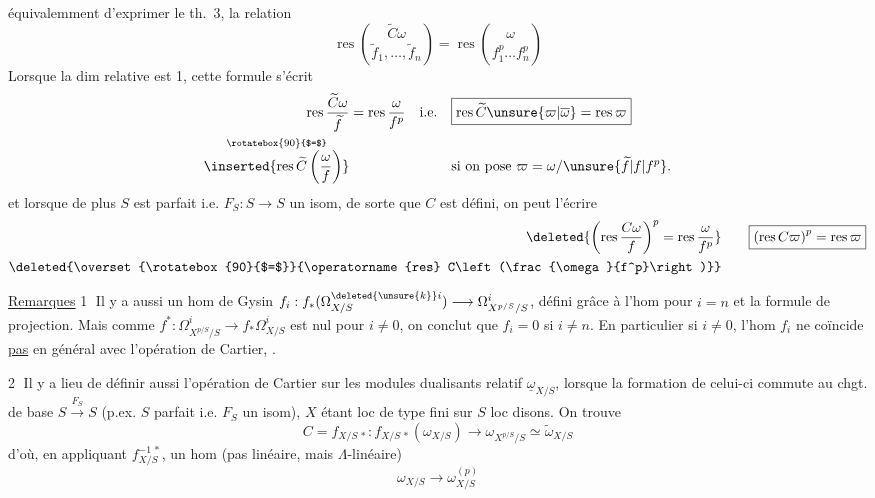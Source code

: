  équivalemment d'exprimer le th.~3, la relation
\[
\boxed{\operatorname{res}\binom{\widetilde C\omega}{\widetilde f_1,\ldots,\widetilde f_n}
 =\operatorname{res}\binom{\omega}{f_1^p\ldots f_n^p}}
\]
Lorsque la dim relative est 1, cette formule s'écrit
\[
\begin{aligned}
\operatorname{res}\frac{\widetilde C\omega}{\widetilde f}
 &=\operatorname{res}\frac{\omega}{f^p}
 &\text{i.e.}\quad &\boxed{\operatorname{res}\widetilde C\unsure{\varpi|\overline\omega}=\operatorname{res}\varpi}\\
\overset{\rotatebox{90}{$=$}}{\inserted{\operatorname{res}\widetilde C\left(\frac{\omega}{f}\right)}}
 &&&\text{si on pose }\varpi=\omega/\unsure{\widetilde f|f|f^p}.
\end{aligned}
\]
et lorsque de plus $S$ est parfait i.e. $F_S:S\longrightarrow S$ un isom, de sorte que $C$ est défini, on peut l'écrire
\[
\begin{aligned}
\deleted{\left(\operatorname{res}\frac{C\omega}{f}\right)^p=\operatorname{res}\frac{\omega}{f^p}}
 &\qquad \boxed{\left(\operatorname{res} C\varpi\right)^p=\operatorname{res}\varpi}\\
\deleted{\overset{\rotatebox{90}{$=$}}{\operatorname{res} C\left(\frac{\omega}{f^p}\right)}}&
\end{aligned}
\]

\uline{Remarques} \textcircled{1} Il y a aussi un hom de Gysin $f_i:f_*(\Omega^{\deleted{\unsure{k}}i}_{X/S})\longrightarrow\Omega^i_{X^{p/S}/S}$, défini grâce à l'hom  pour $i=n$ et la formule de projection. Mais comme $f^\ast:\Omega^i_{X^{p/S}/S}\longrightarrow f_*\Omega^i_{X/S}$ est nul pour $i\ne0$, on conclut que $f_i=0$ si $i\ne n$. En particulier si $i\ne0$, l'hom $f_i$ ne coïncide \uline{pas} en général avec l'opération de Cartier, .

\textcircled{2} Il y a lieu de définir aussi l'opération de Cartier  sur les modules dualisants relatif $\underline{\omega}_{X/S}$,  lorsque la formation de celui-ci commute au chgt. de base $S\xrightarrow{F_S}S$  (p.ex. $S$ parfait i.e. $F_S$ un isom),  $X$ étant loc de type fini sur $S$ loc  disons. On trouve
\[
 C=f_{X/S\,*}:f_{X/S\,*}(\omega_{X/S})\longrightarrow
 \omega_{X^{p/S}/S}\simeq\widetilde\omega_{X/S}
\]
d'où, en appliquant $f_{X/S}^{-1\,*}$,  un hom (pas linéaire, mais $\Lambda$-linéaire)
\[
 \omega_{X/S}\longrightarrow\omega_{X/S}^{(p)}
\]
